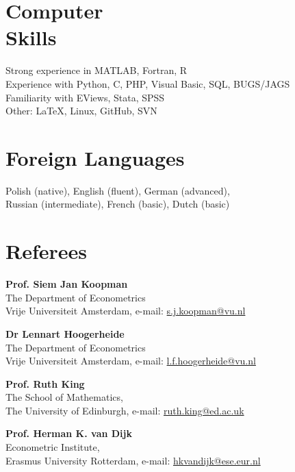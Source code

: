 \documentclass[margin,line]{resume}
\begin{document}
\begin{resume}
\newpage	

   \section{\mysidestyle Computer\\ Skills} 
   Strong experience in MATLAB, Fortran, R   \vspace{1mm}\\
   Experience with Python, C, PHP, Visual Basic, SQL, BUGS/JAGS \vspace{1mm}\\
	Familiarity with EViews, Stata, SPSS \vspace{1mm} \\
	Other: \LaTeX, Linux, GitHub, SVN  

   \section{\mysidestyle Foreign Languages}  
	Polish (native), English (fluent),  German (advanced),    \\
    Russian (intermediate),  French (basic),  Dutch (basic)

 
    
\section{\mysidestyle Referees} 

 \textbf{Prof. Siem Jan Koopman} \\    
 The Department of Econometrics \\
 Vrije Universiteit Amsterdam, e-mail: \url{s.j.koopman@vu.nl}

 \textbf{Dr Lennart Hoogerheide} \\  
 The Department of Econometrics \\  
 Vrije Universiteit Amsterdam, e-mail: \url{l.f.hoogerheide@vu.nl}

 \textbf{Prof. Ruth King} \\  
 The School of Mathematics,\\  
 The University of Edinburgh, e-mail: \url{ruth.king@ed.ac.uk}
 
 \textbf{Prof. Herman K. van Dijk} \\  
 Econometric Institute,\\  
 Erasmus University Rotterdam, e-mail: \url{hkvandijk@ese.eur.nl }
\end{resume}
\end{document}
